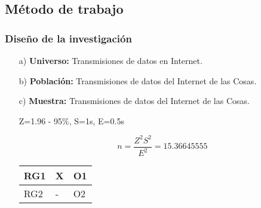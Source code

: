     \subsection{Método de trabajo}    
            \subsubsection{Diseño de la investigación}
                \begin{enumerate}   
                    \item[a)]{\bf Universo:} Transmisiones de datos en Internet.\par
                    \item[b)]{\bf Población:} Transmisiones de datos del Internet de las Cosas.\par
                    \item[c)]{\bf Muestra:} Transmisiones de datos del Internet de las Cosas.\par
                        Z=1.96 - 95\%, S=1s, E=0.5s\par
                        \begin{equation}\label{eq:ej}
                            n = \frac{Z^{2}S^{2}}{E^{2}} = 15.36645555
                        \end{equation}
                        \begin{table}[h!]
                            \centering
                            \begin{tabular}{|p{1cm}|p{1cm}|p{1cm}|} \hline
            
                            RG1 &
                            X &
                            O1 
            
                            \\ \hline

                            RG2 &
                            - &
                            O2 
            

\end{tabular}
\end{table}
\end{enumerate}
